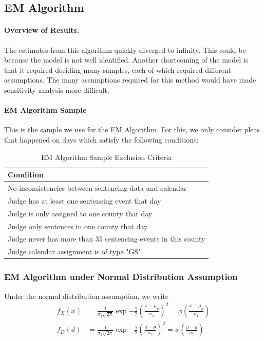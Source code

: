 \documentclass[11pt, oneside]{article}   	%
\theoremstyle{ModifiedStyle}
\begin{document}
	\subsection{EM Algorithm}
		\paragraph{Overview of Results.} The estimates from this algorithm quickly diverged to infinity. This could be because the model is not well identified. Another shortcoming of the model is that it required deciding many samples, each of which required different assumptions. The many assumptions required for this method would have made sensitivity analysis more difficult.

		\paragraph{EM Algorithm Sample} This is the sample we use for the EM Algorithm. For this, we only consider pleas that happened on days which satisfy the following conditions:
			\begin{table}[H]
				\centering
				\caption{EM Algorithm Sample Exclusion Criteria}
				\begin{tabular}{|l|}
				\hline
				\textbf{Condition}                                                  \\ \hline
				No inconsistencies between sentencing data and calendar \\ \hline
				Judge has at least one sentencing event that day         \\ \hline
				Judge is only assigned to one county that day          \\ \hline
				Judge only sentences in one county that day             \\ \hline
				Judge never has more than 35 sentencing events in this county \\ \hline
				Judge calendar assignment is of type "GS"           \\ \hline
				\end{tabular}
			\end{table}

	  \subsubsection{EM Algorithm under Normal Distribution Assumption}
	    Under the normal distribution assumption, we write
			\begin{align*}
				f_X(x) &= \frac{1}{\sigma_1 \sqrt{2\pi}} \exp{-\frac{1}{2} (\frac{x-\mu_p}{\sigma_1})^2} = \phi(\frac{x-\mu_p}{\sigma_1})\\
				f_D(d) &= \frac{1}{\sigma_2 \sqrt{2\pi}} \exp{-\frac{1}{2} (\frac{d - \theta}{\sigma_2})^2} = \phi(\frac{d-\theta}{\sigma_2})
			\end{align*}
\end{document}
